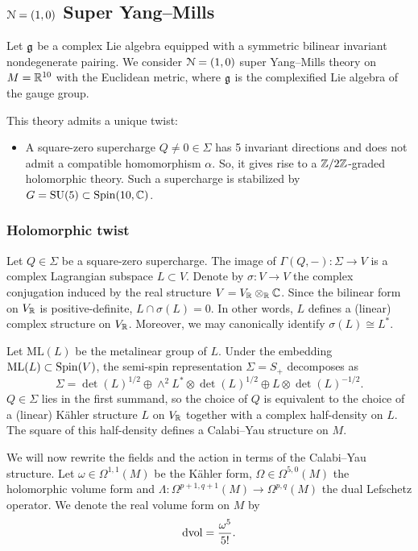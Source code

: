 \documentclass[10pt, oneside]{article}
\newcommand{\ML}{\mathrm{ML}}
\begin{document}
\subsection{\texorpdfstring{$\mathcal N=(1, 0)$}{N=(1,0)} Super Yang--Mills}

Let $\mathfrak g$ be a complex Lie algebra equipped with a symmetric bilinear invariant nondegenerate pairing. We consider $\mathcal N=(1, 0)$ super Yang--Mills theory on $M=\mathbb R^{10}$ with the Euclidean metric, where $\mathfrak g$ is the complexified Lie algebra of the gauge group.

This theory admits a unique twist:
\begin{itemize}
\item A square-zero supercharge $Q\neq 0\in\Sigma$ has 5 invariant directions and does not admit a compatible homomorphism $\alpha$. So, it gives rise to a $\mathbb Z/2\mathbb Z$-graded holomorphic theory. Such a supercharge is stabilized by $G=\mathrm{SU}(5)\subset \mathrm{Spin}(10, \mathbb C)$.
\end{itemize}

\subsubsection{Holomorphic twist}
\label{sect:10dholomorphictwist}

Let $Q\in\Sigma$ be a square-zero supercharge. The image of $\Gamma(Q, -)\colon \Sigma\rightarrow V$ is a complex Lagrangian subspace $L\subset V$. Denote by $\sigma\colon V\rightarrow V$ the complex conjugation induced by the real structure $V = V_\mathbb R\otimes_\mathbb R\mathbb C$. Since the bilinear form on $V_\mathbb R$ is positive-definite, $L\cap \sigma(L) = 0$. In other words, $L$ defines a (linear) complex structure on $V_\mathbb R$. Moreover, we may canonically identify $\sigma(L)\cong L^*$.

Let $\ML(L)$ be the metalinear group of $L$. Under the embedding $\ML(L)\subset \Spin(V)$, the semi-spin representation $\Sigma=S_+$ decomposes as
\[\Sigma = \det(L)^{1/2} \oplus \wedge^2 L^*\otimes \det(L)^{1/2}\oplus L\otimes \det(L)^{-1/2}.\]
$Q\in\Sigma$ lies in the first summand, so the choice of $Q$ is equivalent to the choice of a (linear) K\"ahler structure $L$ on $V_\mathbb R$ together with a complex half-density on $L$. The square of this half-density defines a Calabi--Yau structure on $M$.

We will now rewrite the fields and the action in terms of the Calabi--Yau structure. Let $\omega\in\Omega^{1, 1}(M)$ be the K\"ahler form, $\Omega\in\Omega^{5, 0}(M)$ the holomorphic volume form and $\Lambda\colon \Omega^{p+1, q+1}(M)\rightarrow \Omega^{p, q}(M)$ the dual Lefschetz operator. We denote the real volume form on $M$ by
\[\operatorname{dvol} = \frac{\omega^5}{5!}.\]
\end{document}
